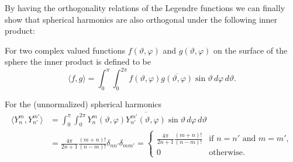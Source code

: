 By having the orthogonality relations of the Legendre functions we can finally
show that spherical harmonics are also orthogonal under the following inner
product:

\begin{definition}
  \label{kugel:def:inner-product-s2}
  For two complex valued functions $f(\vartheta, \varphi)$ and $g(\vartheta,
  \varphi)$ on the surface of the sphere the inner product is defined to be
  \begin{equation*}
    \langle f, g \rangle
    = \int_{0}^\pi \int_0^{2\pi}
      f(\vartheta, \varphi) \overline{g(\vartheta, \varphi)}
      \sin \vartheta \, d\varphi \, d\vartheta.
  \end{equation*}
\end{definition}


\begin{theorem} For the (unnormalized) spherical harmonics
  \label{kugel:thm:spherical-harmonics-ortho}
  \begin{align}
    \langle Y^m_n, Y^{m'}_{n'} \rangle
    &= \int_{0}^\pi \int_0^{2\pi}
      Y^m_n(\vartheta, \varphi) \overline{Y^{m'}_{n'}(\vartheta, \varphi)}
      \sin \vartheta \, d\varphi \, d\vartheta
      \label{kugel:eq:spherical-harmonics-inner-prod} \\
    &= \frac{4\pi}{2n + 1} \frac{(m + n)!}{(n - m)!} \delta_{nn'} \delta_{mm'}
    = \begin{cases}
      \frac{4\pi}{2n + 1} \frac{(m + n)!}{(n - m)!}
        & \text{if } n = n' \text{ and } m = m', \nonumber \\
      0 & \text{otherwise}.
    \end{cases}
  \end{align}
\end{theorem}
